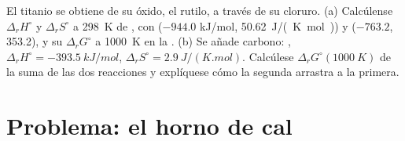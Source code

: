 \begin{exercise}[$\star\star\star$]\label{exo:b2:reaction-free-energy:12}
El titanio se obtiene de su óxido, el rutilo, a través de su cloruro. (a) Calcúlense
$\Delta_r H^\circ$ y $\Delta_r S^\circ$ a \qty{298}{K} de , con  ($-944.0$ \unit{kJ/mol},
\qty{50.62}{J/(K.mol)}) y  ($-763.2$, 353.2), y su
$\Delta_r G^\circ$ a \qty{1000}{K} en la .
(b) Se añade carbono: , $\Delta_r H^\circ =
\qty{-393.5}{kJ/mol}$, $\Delta_r S^\circ = \qty{+2.9}{J/(K.mol)}$. Calcúlese
$\Delta_r G^\circ(\qty{1000}{K})$ de la suma de las dos reacciones y
explíquese cómo la segunda arrastra a la primera.
\end{exercise}

\section{Problema: el horno de cal}

